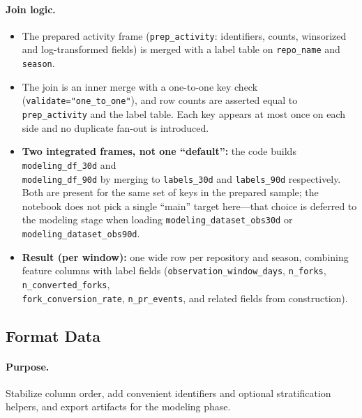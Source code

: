 \paragraph{Join logic.}
\begin{itemize}
  \item The prepared activity frame (\texttt{prep\_activity}: identifiers, counts, winsorized and log-transformed fields) is merged with a label table on \texttt{repo\_name} and \texttt{season}.
  \item The join is an inner merge with a one-to-one key check (\texttt{validate="one\_to\_one"}), and row counts are asserted equal to \texttt{prep\_activity} and the label table. Each key appears at most once on each side and no duplicate fan-out is introduced.
  \item \textbf{Two integrated frames, not one ``default'':} the code builds \texttt{modeling\_df\_30d} and\\ \texttt{modeling\_df\_90d} by merging to \texttt{labels\_30d} and \texttt{labels\_90d} respectively. Both are present for the same set of keys in the prepared sample; the notebook does not pick a single ``main'' target here---that choice is deferred to the modeling stage when loading
  \texttt{modeling\_dataset\_obs30d} or
  \texttt{modeling\_dataset\_obs90d}.
  \item \textbf{Result (per window):} one wide row per repository and season, combining feature columns with label fields (\texttt{observation\_window\_days}, \texttt{n\_forks}, \texttt{n\_converted\_forks},\\ \texttt{fork\_conversion\_rate}, \texttt{n\_pr\_events}, and related fields from construction).
\end{itemize}

\subsection{Format Data}

\paragraph{Purpose.} Stabilize column order, add convenient identifiers and optional stratification helpers, and export artifacts for the modeling phase.

